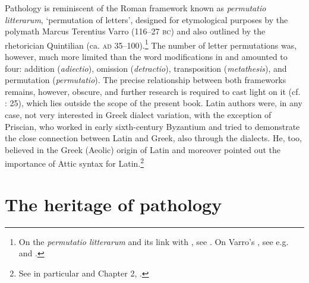 Pathology is reminiscent of the Roman framework known as \textit{permutatio litterarum}, ‘permutation of letters’, designed for etymological purposes by the polymath Marcus Terentius Varro (116–27 \textsc{bc}) and also outlined by the rhetorician Quintilian (ca. \textsc{ad} 35–100).\footnote{{On the} {\textit{permutatio litterarum} }{and its link with , see \citet[esp. 25–28, 37]{Ax1987}. On Varro’s , see e.g. \citet{Pfaffel1981} and \citet[7--10, {\textit{passim}}]{Taylor1996}.}} The number of letter permutations was, however, much more limited than the word modifications in  and amounted to four: addition (\textit{adiectio}), omission (\textit{detractio}), transposition (\textit{metathesis}), and permutation (\textit{permutatio}). The precise relationship between both frameworks remains, however, obscure, and further research is required to cast light on it (cf. \citealt{Ax1987}: 25), which lies outside the scope of the present book. Latin authors were, in any case, not very interested in Greek dialect variation, with the exception of Priscian, who worked in early sixth-century Byzantium and tried to demonstrate the close connection between Latin and Greek, also through the dialects. He, too, believed in the Greek (Aeolic) origin of Latin and moreover pointed out the importance of Attic syntax for Latin.\footnote{{See in particular \citet[]{Conduche_latin_nodate} and Chapter 2, .}}


\section{The heritage of pathology}\label{sec:6.2}

